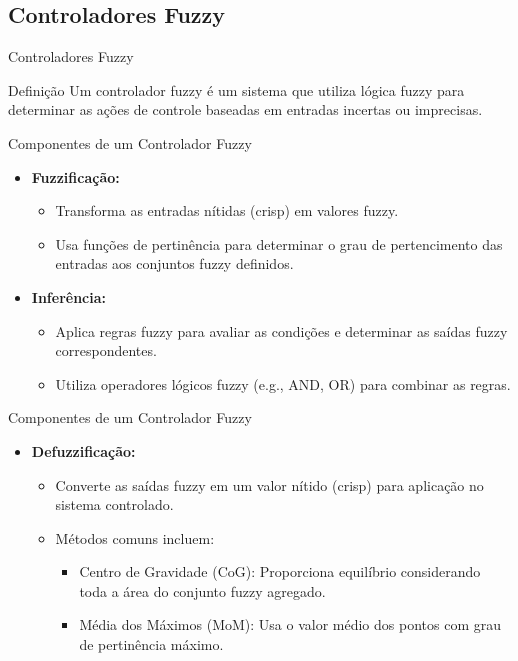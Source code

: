 \documentclass[aspectratio=169]{beamer}
\begin{document}
\subsection{Controladores Fuzzy}

\begin{frame}{Controladores Fuzzy}

    \begin{block}{Definição}
        Um controlador fuzzy é um sistema que utiliza lógica fuzzy para determinar as ações de controle baseadas em entradas incertas ou imprecisas.
    \end{block}

\end{frame}

\begin{frame}{Componentes de um Controlador Fuzzy}
    \begin{itemize}
            \item \textbf{Fuzzificação:}
            \begin{itemize}
                \item Transforma as entradas nítidas (crisp) em valores fuzzy.
                \item Usa funções de pertinência para determinar o grau de pertencimento das entradas aos conjuntos fuzzy definidos.
            \end{itemize}
            \item \textbf{Inferência:}
            \begin{itemize}
                \item Aplica regras fuzzy para avaliar as condições e determinar as saídas fuzzy correspondentes.
                \item Utiliza operadores lógicos fuzzy (e.g., AND, OR) para combinar as regras.
            \end{itemize}

        \end{itemize}
 \end{frame}

 \begin{frame}{Componentes de um Controlador Fuzzy}
    \begin{itemize}
            \item \textbf{Defuzzificação:}
            \begin{itemize}
                \item Converte as saídas fuzzy em um valor nítido (crisp) para aplicação no sistema controlado.
                \item Métodos comuns incluem:
                \begin{itemize}
                    \item Centro de Gravidade (CoG): Proporciona equilíbrio considerando toda a área do conjunto fuzzy agregado.
                    \item Média dos Máximos (MoM): Usa o valor médio dos pontos com grau de pertinência máximo.
                \end{itemize}
            \end{itemize}
        \end{itemize}
 \end{frame}
\end{document}
